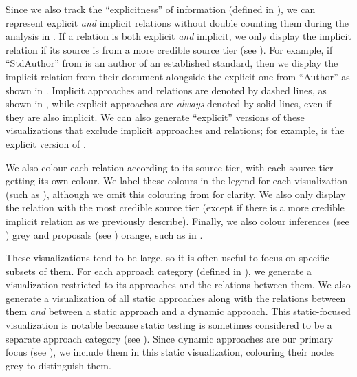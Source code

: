     \label{visExplicit}
    Since we also track the ``explicitness'' of information (defined in
    ), we can represent explicit \emph{and} implicit
    relations without double counting them during the analysis in
    . If a relation is both explicit \emph{and} implicit,
    we only display the implicit relation if its source is from a more
    credible source tier (see ). For example, if
    ``StdAuthor'' from  is an author of an
    established standard, then we display the implicit relation from their
    document alongside the explicit one from ``Author'' as shown in
    .
    Implicit approaches and relations are denoted by dashed lines, as shown in
    , while explicit approaches are
    \emph{always} denoted by solid lines, even if they are also implicit. We
    can also generate ``explicit'' versions of these visualizations that exclude
    implicit approaches and relations; for example, 
    is the explicit version of . %

    We also colour each relation according to its source tier, with each source
    tier getting its own colour. We label these colours in the legend for each
    visualization (such as ), although we omit this
    colouring from  for
    clarity. We also only display the relation with the most credible source
    tier (except if there is a more credible implicit relation as we previously
    describe). Finally, we also colour inferences (see ) grey and
    proposals (see ) orange, such as in \recFigs{}.

\fi
These visualizations tend to be large, so it is often useful to focus on
specific subsets of them. \ifnotpaper For each approach category (defined in
    ), we generate a visualization restricted to its approaches
    and the relations between them. We also generate a visualization of all static
    approaches along with the relations between them \emph{and} between a
    static approach and a dynamic approach. This static-focused visualization is
    notable because static testing is sometimes considered to be a separate
    approach category (see ). Since dynamic
    approaches are our primary focus (see ), we include them
    in this static visualization, colouring their nodes grey to distinguish them.

